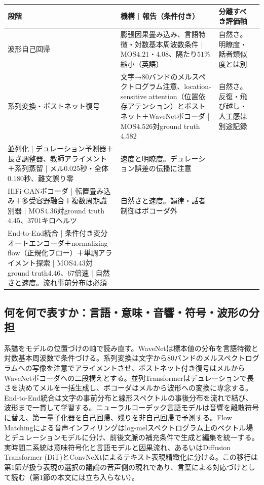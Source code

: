\documentclass[lualatex,a4paper,10pt]{jlreq}
\begin{document}
\begin{center}
\small
\begin{tabularx}{\textwidth}{@{}p{}p{}p{}X@{}}
\toprule
段階 & 機構 | 報告（条件付き） & 分離すべき評価軸 \\
\midrule
波形自己回帰\autocite{btd051} & 膨張因果畳み込み、言語特徴・対数基本周波数条件 | MOS$4.21$・$4.08$、隔たり$51\%$縮小（英語） & 自然さ。明瞭度・話者類似度とは別 \\
系列変換\autocite{btd052}・ポストネット復号\autocite{btd053} & 文字→80バンドのメルスペクトログラム注意、location-sensitive attention（位置依存アテンション）とポストネット＋WaveNetボコーダ | MOS$4.526$対ground truth$4.582$ & 自然さ。反復・飛び越し・人工感は別途記録 \\
並列化\autocite{btd054} | デュレーション予測器＋長さ調整器、教師アライメント＋系列蒸留 | メル$0.025$秒・全体$0.180$秒、難文誤り零 & 速度と明瞭度。デュレーション誤差の伝播に注意 \\
HiFi-GANボコーダ\autocite{btd055} | 転置畳み込み＋多受容野融合＋複数周期識別器 | MOS$4.36$対ground truth$4.45$、$3701$キロヘルツ & 自然さと速度。韻律・話者制御はボコーダ外 \\
End-to-End統合\autocite{btd056} | 条件付き変分オートエンコーダ＋normalizing flow（正規化フロー）＋単調アライメント探索 | MOS$4.43$対ground truth$4.46$、$67$倍速 | 自然さと速度。流れ事前分布は必須 \\
\bottomrule
\end{tabularx}
\end{center}

\subsection{何を何で表すか：言語・意味・音響・符号・波形の分担}
系譜をモデルの位置づけの軸で読み直す。WaveNetは標本値の分布を言語特徴と対数基本周波数で条件づける\autocite{btd051}。系列変換は文字から80バンドのメルスペクトログラムへの写像を注意でアライメントさせ、ポストネット付き復号はメルからWaveNetボコーダへの二段構えとする\autocite{btd052,btd053}。並列Transformerはデュレーションで長さを決めてメルを一括生成し、ボコーダはメルから波形への変換に専念する\autocite{btd054,btd055}。End-to-End統合は文字の事前分布と線形スペクトルの事後分布を流れで結び、波形まで一貫して学習する\autocite{btd056}。ニューラルコーデック言語モデルは音響を離散符号に替え、第一量子化器を自己回帰、残りを非自己回帰で予測する\autocite{btd058}。Flow Matchingによる音声インフィリングはlog-melスペクトログラム上のベクトル場とデュレーションモデルに分け、前後文脈の補充条件で生成と編集を統一する\autocite{btd060}。実時間二系統は意味符号化と言語モデルと因果流れ、あるいはDiffusion Transformer (DiT)とConvNeXtによるテキスト表現精緻化に分ける\autocite{btd132,btd133}。この移行は第1節が扱う表現の選択の議論の音声側の現れであり、言葉による対応づけとして読む（第1節の本文には立ち入らない）。
\end{document}
